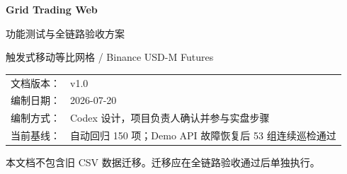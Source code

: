 \documentclass[11pt,a4paper,fontset=mac]{ctexart}
\begin{document}
\hypersetup{pageanchor=false}
\begin{titlepage}
  \centering
  \vspace*{3.5cm}
  {\Huge\bfseries Grid Trading Web\par}
  \vspace{0.7cm}
  {\LARGE 功能测试与全链路验收方案\par}
  \vspace{1.2cm}
  {\large 触发式移动等比网格 / Binance USD-M Futures\par}
  \vfill
  \begin{tabular}{rl}
    文档版本： & v1.0 \\
    编制日期： & 2026-07-20 \\
    编制方式： & Codex 设计，项目负责人确认并参与实盘步骤 \\
    当前基线： & 自动回归 150 项；Demo API 故障恢复后 53 组连续巡检通过 \\
  \end{tabular}
  \vfill
  {\small 本文档不包含旧 CSV 数据迁移。迁移应在全链路验收通过后单独执行。\par}
\end{titlepage}

\clearpage
\hypersetup{pageanchor=true}
\tableofcontents
\clearpage
{}

















\end{document}
